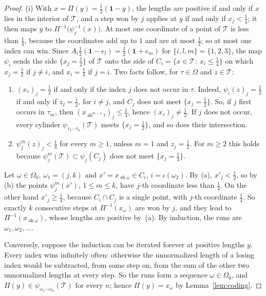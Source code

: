 \documentclass[11pt]{amsart}
\theoremstyle{definition}
\theoremstyle{remark}
\newcommand{\one}{\mathbf 1}
\newcommand{\cT}{\mathcal T}
\begin{document}
\begin{proof}
(i) With $x=\Pi(y)=\frac12(\one-y)$, the lengths are positive if and only if $x$ lies in the interior of $\cT$, and a step won by $j$ applies at $y$ if and only if $x_j<\frac14$; it then maps $y$ to $\Pi^{-1}\bigl(\psi_j^{-1}(x)\bigr)$. At most one coordinate of a point of $\cT$ is less than $\frac14$, because the coordinates add up to $1$ and are at most $\frac12$; so at most one index can win. Since $A_i\frac12(\one-e_l)=\frac12(\one+e_m)$ for $\{i,l,m\}=\{1,2,3\}$, the map $\psi_i$ sends the side $\{x_j=\frac12\}$ of $\cT$ onto the side of $C_i=\{x\in\cT:\ x_i\le\frac14\}$ on which $x_j=\frac12$ if $j\ne i$, and $x_i=\frac14$ if $j=i$. Two facts follow, for $\tau\in\Omega$ and $z\in\cT$:
\begin{enumerate}
\item[(a)] $(x_\tau)_j=\frac12$ if and only if the index $j$ does not occur in $\tau$. Indeed, $\psi_i(z)_j=\frac12$ if and only if $z_j=\frac12$, for $i\ne j$, and $C_j$ does not meet $\{x_j=\frac12\}$. So, if $j$ first occurs in $\tau_m$, then $(x_{\operatorname{sh}^{m-1}\tau})_j\le\frac14$, hence $(x_\tau)_j\ne\frac12$. If $j$ does not occur, every cylinder $\psi_{\tau_1\cdots\tau_n}(\cT)$ meets $\{x_j=\frac12\}$, and so does their intersection.
\item[(b)] $\psi_j^m(z)_j<\frac14$ for every $m\ge1$, unless $m=1$ and $z_j=\frac12$. For $m\ge2$ this holds because $\psi_j^m(\cT)\subset\psi_j(C_j)$ does not meet $\{x_j=\frac14\}$.
\end{enumerate}
Let $\omega\in\Omega_0$, $\omega_1=(j,k)$ and $x'=x_{\operatorname{sh}\omega}\in C_i$, $i=\iota(\omega_2)$. By (a), $x'_j<\frac12$, so by (b) the points $\psi_j^m(x')$, $1\le m\le k$, have $j$-th coordinate less than $\frac14$. On the other hand $x'_j\ge\frac14$, because $C_i\cap C_j$ is a single point, with $j$-th coordinate $\frac14$. So exactly $k$ consecutive steps at $\Pi^{-1}(x_\omega)$ are won by $j$, and they lead to $\Pi^{-1}(x_{\operatorname{sh}\omega})$, whose lengths are positive by~(a). By induction, the runs are $\omega_1,\omega_2,\dots$.

Conversely, suppose the induction can be iterated forever at positive lengths $y$. Every index wins infinitely often: otherwise the unnormalized length of a losing index would be subtracted, from some step on, from the sum of the other two unnormalized lengths at every step. So the runs form a sequence $\omega\in\Omega_0$, and $\Pi(y)\in\psi_{\omega_1\cdots\omega_n}(\cT)$ for every $n$; hence $\Pi(y)=x_\omega$ by Lemma~\ref{lem:coding}.


\end{proof}
\end{document}
